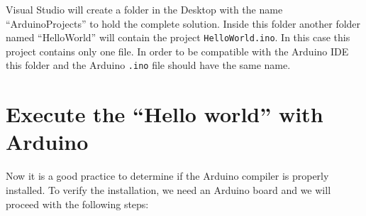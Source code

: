 Visual Studio will create a folder in the Desktop with the name ``ArduinoProjects'' to hold the complete solution. Inside this folder another folder named ``HelloWorld'' will contain the project \texttt{HelloWorld.ino}. In this case this project contains only one file. In order to be compatible with the Arduino IDE this folder and the Arduino \texttt{.ino} file should have the same name. 

\vspace{0.5cm}
    \section{Execute the ``Hello world'' with Arduino}

Now it is a good practice to determine if the Arduino compiler is properly installed. To verify the installation, we need an Arduino board and we will proceed with the following steps: 

